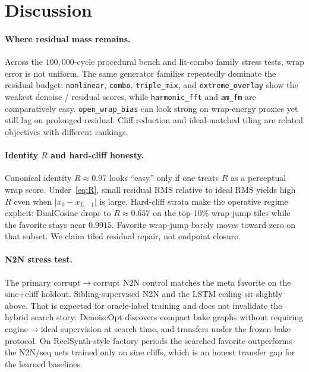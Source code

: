 \section{Discussion}
\label{sec:discussion}

\paragraph{Where residual mass remains.}
Across the $100{,}000$-cycle procedural bench and lit-combo family stress tests, wrap error is not uniform.
The same generator families repeatedly dominate the residual budget: \texttt{nonlinear}, \texttt{combo}, \texttt{triple\_mix}, and \texttt{extreme\_overlay} show the weakest denoise / residual scores, while \texttt{harmonic\_fft} and \texttt{am\_fm} are comparatively easy.
\texttt{open\_wrap\_bias} can look strong on wrap-energy proxies yet still lag on prolonged residual. Cliff reduction and ideal-matched tiling are related objectives with different rankings.

\paragraph{Identity $R$ and hard-cliff honesty.}
Canonical identity $R\approx 0.97$ looks ``easy'' only if one treats $R$ as a perceptual wrap score.
Under~\eqref{eq:R}, small residual RMS relative to ideal RMS yields high $R$ even when $|x_0-x_{L-1}|$ is large.
Hard-cliff strata make the operative regime explicit: DualCosine drops to $R\approx 0.657$ on the top-10\% wrap-jump tiles while the favorite stays near $0.9915$.
Favorite wrap-jump barely moves toward zero on that subset.
We claim tiled residual repair, not endpoint closure.

\paragraph{N2N stress test.}
The primary corrupt$\to$corrupt N2N control matches the meta favorite on the sine{+}cliff holdout.
Sibling-supervised N2N and the LSTM ceiling sit slightly above.
That is expected for oracle-label training and does not invalidate the hybrid search story: DenoiseOpt discovers compact bake graphs without requiring engine$\to$ideal supervision at search time, and transfers under the frozen bake protocol.
On ReelSynth-style factory periods the searched favorite outperforms the N2N/seq nets trained only on sine cliffs, which is an honest transfer gap for the learned baselines.

